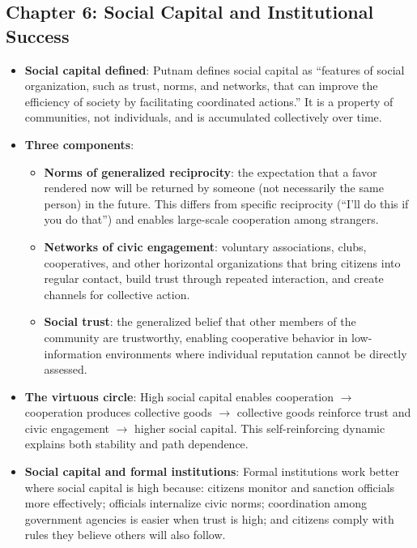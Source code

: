 \documentclass[12pt]{article}
\begin{document}
\begin{itemize}[leftmargin=*, itemsep=4pt]
\section{Chapter 6: Social Capital and Institutional Success}

\begin{itemize}[leftmargin=*, itemsep=4pt]
    \item \textbf{Social capital defined}: Putnam defines social capital as ``features of social organization, such as trust, norms, and networks, that can improve the efficiency of society by facilitating coordinated actions.'' It is a property of communities, not individuals, and is accumulated collectively over time.
    \item \textbf{Three components}:
        \begin{itemize}
            \item \textbf{Norms of generalized reciprocity}: the expectation that a favor rendered now will be returned by someone (not necessarily the same person) in the future. This differs from specific reciprocity (``I'll do this if you do that'') and enables large-scale cooperation among strangers.
            \item \textbf{Networks of civic engagement}: voluntary associations, clubs, cooperatives, and other horizontal organizations that bring citizens into regular contact, build trust through repeated interaction, and create channels for collective action.
            \item \textbf{Social trust}: the generalized belief that other members of the community are trustworthy, enabling cooperative behavior in low-information environments where individual reputation cannot be directly assessed.
        \end{itemize}
    \item \textbf{The virtuous circle}: High social capital enables cooperation $\to$ cooperation produces collective goods $\to$ collective goods reinforce trust and civic engagement $\to$ higher social capital. This self-reinforcing dynamic explains both stability and path dependence.
    \item \textbf{Social capital and formal institutions}: Formal institutions work better where social capital is high because: citizens monitor and sanction officials more effectively; officials internalize civic norms; coordination among government agencies is easier when trust is high; and citizens comply with rules they believe others will also follow.

\end{itemize}
\end{itemize}
\end{document}

